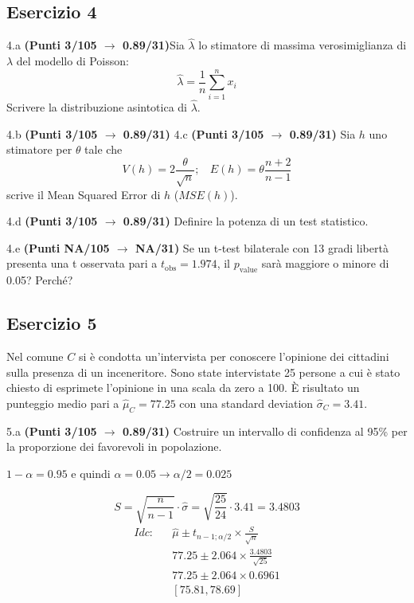\documentclass[
  11pt,
]{book}
\theoremstyle{mytheoremstyle}
\theoremstyle{mydefstyle}
\newenvironment{sol}
  {
  \begin{tcolorbox}[enhanced,breakable,arc=0.1mm,boxrule=1pt,colback=white,colframe=iblue,
  title=\bf \fontfamily{lmss}\selectfont \hspace{.5 cm} Soluzione,drop fuzzy shadow]

}{
\end{tcolorbox}
  }
\begin{document}
\subsection{Esercizio 4}\label{esercizio-4-30}

4.a \textbf{(Punti 3/105 \(\rightarrow\) 0.89/31)}Sia \(\hat \lambda\) lo stimatore di massima verosimiglianza di \(\lambda\) del modello di Poisson:
\[\hat\lambda =  \frac 1n\sum_{i=1}^nx_i\]
Scrivere la distribuzione asintotica di \(\hat \lambda\).

4.b \textbf{(Punti 3/105 \(\rightarrow\) 0.89/31)} 4.c \textbf{(Punti 3/105 \(\rightarrow\) 0.89/31)} Sia \(h\) uno stimatore per \(\theta\) tale che
\[V(h)=2\frac\theta {\sqrt{n}};~~~~E(h)=\theta\frac{n+2}{n-1}\]
scrive il Mean Squared Error di \(h\) (\(MSE(h)\)).

4.d \textbf{(Punti 3/105 \(\rightarrow\) 0.89/31)} Definire la potenza di un test statistico.

4.e \textbf{(Punti NA/105 \(\rightarrow\) NA/31)} Se un t-test bilaterale con 13 gradi libertà presenta una
t osservata pari a \(t_\text{obs}=1.974\), il \(p_\text{value}\) sarà maggiore o minore di 0.05? Perché?

\subsection{Esercizio 5}\label{esercizio-5-28}

Nel comune \(C\) si è condotta un'intervista per conoscere l'opinione
dei cittadini sulla presenza di un inceneritore. Sono state intervistate
25 persone a cui è stato chiesto di esprimete l'opinione in una scala da zero a 100.
È risultato un punteggio medio pari a \(\hat\mu_C=77.25\) con una standard deviation
\(\hat\sigma_C=3.41\).

5.a \textbf{(Punti 3/105 \(\rightarrow\) 0.89/31)} Costruire un intervallo di confidenza al 95\%
per la proporzione dei favorevoli in popolazione.

\begin{sol}
\(1-\alpha =0.95\) e quindi \(\alpha=0.05\rightarrow \alpha/2=0.025\)

\[
      S  =\sqrt{\frac {n}{n-1}}\cdot\hat\sigma =
     \sqrt{\frac { 25 }{ 24 }}\cdot 3.41 = 3.4803 
\]
\begin{eqnarray*}
  Idc: & &  \hat\mu \pm  t_{n-1;\alpha/2} \times \frac{S}{\sqrt{n}} \\
     & &  77.25 \pm  2.064 \times \frac{ 3.4803 }{\sqrt{ 25 }} \\
     & &  77.25 \pm  2.064 \times  0.6961 \\
     & & [ 75.81 ,  78.69 ]
\end{eqnarray*}

\end{sol}
\end{document}
